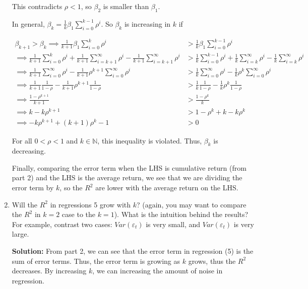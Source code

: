 \documentclass{article}
\newcommand{\N}{\mathbb{N}}
\begin{document}
\begin{enumerate}
This contradicts $\rho < 1$, so $\beta_2$ is smaller than $\beta_1$.

In general, $\beta_k = \frac{1}{k} \beta_1 \sum_{i=0}^{k-1} \rho^i$. So $\beta_k$ is increasing in $k$ if

\begin{align*}
\beta_{k+1} > \beta_{k} 
\implies
\frac{1}{k+1} \beta_1 \sum_{i=0}^{k} \rho^i &> \frac{1}{k} \beta_1 \sum_{i=0}^{k-1} \rho^i \\
\implies 
\frac{1}{k+1} \sum_{i=0}^{k} \rho^i + \frac{1}{k+1} \sum_{i=k+1}^{\infty} \rho^i - \frac{1}{k+1} \sum_{i=k+1}^{\infty} \rho^i &> \frac{1}{k} \sum_{i=0}^{k-1} \rho^i + \frac{1}{k} \sum_{i=k}^{\infty} \rho^i - \frac{1}{k} \sum_{i=k}^{\infty} \rho^i\\
\implies
\frac{1}{k+1} \sum_{i=0}^{\infty} \rho^i - \frac{1}{k+1}\rho^{k+1} \sum_{i=0}^{\infty} \rho^i &> \frac{1}{k} \sum_{i=0}^{\infty} \rho^i  - \frac{1}{k} \rho^k \sum_{i=0}^{\infty} \rho^i\\
\implies
\frac{1}{k+1} \frac{1}{1-\rho} - \frac{1}{k+1}\rho^{k+1} \frac{1}{1-\rho} &> \frac{1}{k} \frac{1}{1-\rho}  - \frac{1}{k} \rho^k \frac{1}{1-\rho}\\
\implies
\frac{1-\rho^{k+1}}{k+1} &> \frac{1 - \rho^k}{k }\\
\implies
k-k\rho^{k+1} &> 1 - \rho^k + k - k\rho^k\\
\implies
-k\rho^{k+1} + (k+1)\rho^k - 1&> 0
\end{align*}

For all $0 < \rho <1$ and $k\in \N$, this inequality is violated. Thus, $\beta_k$ is decreasing.

Finally, comparing the error term when the LHS is cumulative return (from part 2) and the LHS is the average return, we see that we are dividing the error term by $k$, so the $R^2$ are lower with the average return on the LHS.

\pagebreak

\item Will the $R^2$ in regressions 5 grow with $k$? (again, you may want to compare the $R^2$ in $k = 2$ case to the $k = 1$). What is the intuition behind the results? For example, contrast two cases: $Var(\varepsilon_t)$ is very small, and $Var(\varepsilon_t)$ is very large.

\bigskip

\textbf{Solution:} From part 2, we can see that the error term in regression (5) is the sum of error terms.  Thus, the error term is growing as $k$ grows, thus the $R^2$ decreases.  By increasing $k$, we can increasing the amount of noise in regression.


\end{enumerate}
\end{document}
